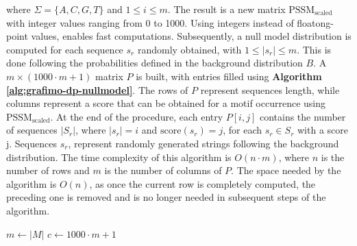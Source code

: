 \documentclass[a4paper, titlepage, openright]{book}
\newcommand{\grafimo}{GRAFIMO\xspace}
\begin{document}
where $\Sigma=\{A,C,G,T\}$ and $1 \leq i \leq m$. The result is a new matrix $\text{PSSM}_{\text{scaled}}$ with integer values ranging from 0 to 1000. Using integers instead of floatong-point values, enables fast computations. Subsequently, a null model distribution is computed for each sequence $s_{r}$ randomly obtained, with $1 \leq |s_{r}| \leq m$. This is done following the probabilities defined in the background distribution $B$. A $m \times (1000 \cdot m + 1)$ matrix $P$ is built, with entries filled using \textbf{Algorithm \ref{alg:grafimo-dp-nullmodel}}. The rows of $P$ represent sequences length, while columns represent a score that can be obtained for a motif occurrence using $\text{PSSM}_{\text{scaled}}$. At the end of the procedure, each entry $P[i,j]$ contains the number of sequences $|S_{r}|$, where $|s_{r}| = i$ and $\text{score}(s_{r})=j$, for each $s_{r} \in S_{r}$ with a score j. Sequences $s_{r}$, represent randomly generated strings following the background distribution. The time complexity of this algorithm is $O(n \cdot m)$, where $n$ is the number of rows and $m$ is the number of columns of $P$. The space needed by the algorithm is $O(n)$, as once the current row is completely computed, the preceding one is removed and is no longer needed in subsequent steps of the algorithm.

\begin{algorithm}[!]
    \caption{Dynamic programming algorithm computing null model in \grafimo \citep{griffin1994staden}}
    \label{alg:grafimo-dp-nullmodel}
    $m \gets |M|$ 
    $c \gets 1000 \cdot m + 1$\;
\end{algorithm}

\end{document}
